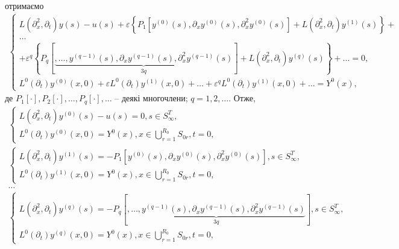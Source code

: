 отримаємо
\begin{gather*}
    \left\{
    \begin{alignedat}{2}
        L(\partial_x^2, \partial_t)y(s) - u(s)
        + \varepsilon \left\{ P_{1}\left[y^{(0)}(s), \partial_x y^{(0)}(s), \partial_x^2 y^{(0)}(s)\right]
        + L(\partial_x^2, \partial_t)y^{(1)}(s) \right\} + \\
        \dots\\
        + \varepsilon^{q} \left\{ P_{q}
        \left[
            \underbrace{
                ,\dots,
                y^{(q-1)}(s), \partial_x y^{(q-1)}(s), \partial_x^2 y^{(q-1)}(s)
            }_{3q}
            \right]
        + L(\partial_x^2, \partial_t)y^{(q)}(s)
        \right\} + \dots = 0,\\
        L^{0}(\partial_t)y^{(0)}(x, 0) + \varepsilon L^{0}(\partial_t)y^{(1)}(x, 0)+\dots+
        \varepsilon^q L^{0}(\partial_t)y^{(1)}(x, 0)+\dots = Y^{0}(x),
    \end{alignedat}
    \right.
\end{gather*}
де $P_{1}[\cdot], P_{2}[\cdot], \dots,P_{q}[\cdot],\dots$ -- деякі многочлени; $q=1,2,\dots$.
Отже,
\begin{gather*}
    \left\{
    \begin{alignedat}{2}
        L(\partial_x^2, \partial_t)y^{(0)}(s) - u(s) = 0, s\in S_\infty^T,\\
        L^{0}(\partial_{t})y^{(0)}(x,0) = Y^{0}(x),x\in\bigcup\limits_{r=1}^{R_{0}} S_{0r},t=0,
    \end{alignedat}
    \right.\\
    \left\{
    \begin{alignedat}{2}
        L(\partial_x^2, \partial_t)y^{(1)}(s) = -P_{1}\left[y^{(0)}(s), \partial_x y^{(0)}(s), \partial_x^2 y^{(0)}(s)\right], s\in S_\infty^T,\\
        L^{0}(\partial_{t})y^{(1)}(x,0) = Y^{0}(x),x\in\bigcup\limits_{r=1}^{R_{0}} S_{0r},t=0,
    \end{alignedat}
    \right.\\
    \dots\\
    \left\{
    \begin{alignedat}{2}
        L(\partial_x^2, \partial_t)y^{(q)}(s) =
        -P_{q}
        \left[
            \underbrace{
                ,\dots,
                y^{(q-1)}(s), \partial_x y^{(q-1)}(s), \partial_x^2 y^{(q-1)}(s)
            }_{3q}
            \right], s\in S_\infty^T,\\
        L^{0}(\partial_{t})y^{(q)}(x,0) = Y^{0}(x),x\in\bigcup\limits_{r=1}^{R_{0}} S_{0r},t=0,
    \end{alignedat}
    \right.
\end{gather*}


